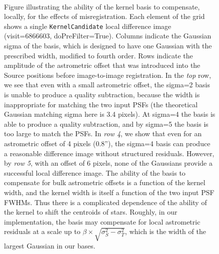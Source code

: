 \documentclass[prd, nofootinbib, floatfix, 11pt,tightenlines,times]{article}
\begin{document}
\begin{figure}
 \\
\caption{Figure illustrating the ability of the kernel basis to
  compensate, locally, for the effects of misregistration.  Each
  element of the grid shows a single {\tt KernelCandidate} local
  difference image (visit=6866603, doPreFilter=True).  Columns
  indicate the Gaussian sigma of the basis, which is designed to have
  one Gaussian with the prescribed width, modified to fourth order.
  Rows indicate the amplitude of the astrometric offset that was
  introduced into the Source positions before image-to-image
  registration.  In the {\it top} row, we see that even with a small
  astrometric offset, the sigma=2 basis is unable to produce a quality
  subtraction, because the width is inappropriate for matching the two
  input PSFs (the theoretical Gaussian matching sigma here is 3.4 pixels).  At
  sigma=4 the basis is able to produce a quality subtraction, and by
  sigma=5 the basis is too large to match the PSFs.  In {\it row 4},
  we show that even for an astrometric offset of 4 pixels (0.8''), the
  sigma=4 basis can produce a reasonable difference image without
  structured residuals.  However, by {\it row 5}, with an offset of 6
  pixels, none of the Gaussians provide a successful local difference
  image.  The ability of the basis to compensate for bulk astrometric
  offsets is a function of the kernel width, and the kernel width is
  itself a function of the two input PSF FWHMs.  Thus there is a
  complicated dependence of the ability of the kernel to shift the
  centroids of stars.  Roughly, in our implementation, the basis may
  compensate for local astrometric residuals at a scale up to $\beta
  \times \sqrt{\sigma_S^2 - \sigma_T^2}$, which is the width of the
  largest Gaussian in our bases.}
\label{kernel_offsets}
\end{figure}
\end{document}
